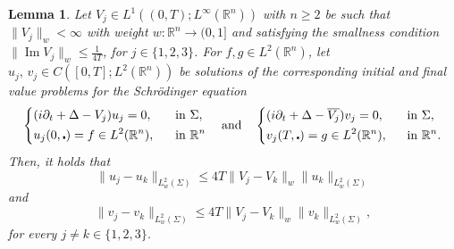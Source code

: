 \documentclass[10pt,a4paper]{amsart}
\newtheorem{lemma}[proposition]{Lemma}
\theoremstyle{remark}
\theoremstyle{definition}
\newcommand{\R}{\mathbb{R}}
\def\Im{\mathop\mathrm{Im}}
\def\ovl{\overline}
\def\cd{\centerdot}
\def\d{\partial}
\begin{document}
\begin{lemma}\label{lem: closeness_of_solutions_time}
Let $V_j\in L^1((0, T); L^\infty(\R^n))$ with $n\geq 2$ be such that $\| V_j \|_{w}< \infty$ with weight $w:\R^n \to (0,1]$ and satisfying the smallness condition $\|  \Im V_j \|_{w} \leq \frac{1}{4T} $, for $j\in\{1,2,3\}$.
For $f,g\in L^2(\R^n)$, let $u_j, \, v_j \in C([0, T]; L^2(\R^n))$ be solutions of the corresponding initial and final value problems for the Schr\"odinger equation
%
\[
\begin{dcases}
(i\d_t+\Delta - V_j)u_j = 0, \quad &\textup{in}\,\, \Sigma, \\
u_j(0, \cd) = f \in L^2(\R^n), &\textup{in}\,\, \R^n
\end{dcases} 
%
\quad \textup{and} \quad
%
\begin{dcases}
(i\d_t+\Delta - \ovl{V_j})v_j = 0, \quad &\textup{in}\,\, \Sigma, \\
v_j(T, \cd) = g\in L^2(\R^n), &\textup{in}\,\, \R^n.
\end{dcases} 
\]
%
Then, it holds that 
%
\begin{equation}\label{eq: solutions_diff1_time}
\|u_j - u_k \|_{L^2_w(\Sigma)} \leq 4T \| V_j - V_k \|_{w} \|u_k\|_{L^2_w(\Sigma)}
\end{equation}
%
and
%
\begin{equation}\label{eq: solutions_diff2_time}
\|v_j - v_k \|_{L^2_w(\Sigma)} \leq 4T \| V_j - V_k \|_{w} \|v_k\|_{L^2_w(\Sigma)},
\end{equation}
%
for every $j \neq k \in \{1, 2, 3 \}$.
\end{lemma}
\end{document}
